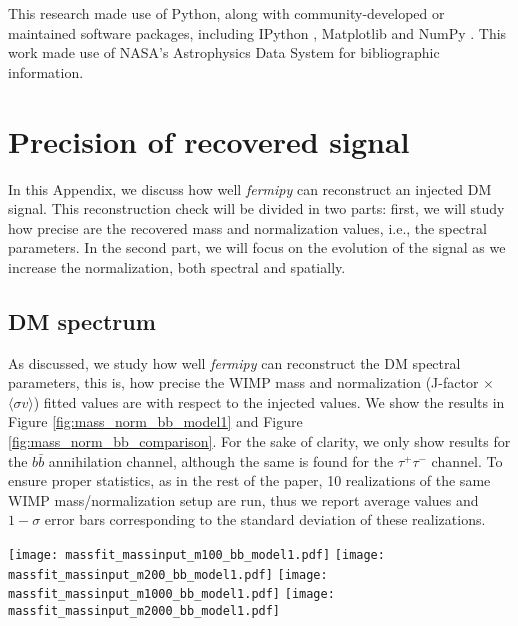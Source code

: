 \documentclass[%
 reprint,
nofootinbib,
 amsmath,amssymb,
 aps,
]{revtex4-2}
\begin{document}
This research made use of Python, along with community-developed or maintained software packages, including IPython \cite{Perez2007}, Matplotlib \cite{Hunter2007} and NumPy \cite{Walt2011}. This work made use of NASA’s Astrophysics Data System for bibliographic information.

\appendix

\section{Precision of recovered signal}
In this Appendix, we discuss how well \textit{fermipy} can reconstruct an injected DM signal. This reconstruction check will be divided in two parts: first, we will study how precise are the recovered mass and normalization values, i.e., the spectral parameters. In the second part, we will focus on the evolution of the signal as we increase the normalization, both spectral and spatially. %

\subsection{DM spectrum}
\label{app:precision_dm_spectrum}
As discussed, we study how well \textit{fermipy} can reconstruct the DM spectral parameters, this is, how precise the WIMP mass and normalization (J-factor $\times$ $\langle\sigma v\rangle$) fitted values are with respect to the injected values. We show the results in Figure \ref{fig:mass_norm_bb_model1} and Figure \ref{fig:mass_norm_bb_comparison}. For the sake of clarity, we only show results for the $b\bar{b}$ annihilation channel, although the same is found for the $\tau^+\tau^-$ channel. To ensure proper statistics, as in the rest of the paper, 10 realizations of the same WIMP mass/normalization setup are run, thus we report average values and $1-\sigma$ error bars corresponding to the standard deviation of these realizations.

\begin{figure*}[!ht]
\centering
\texttt{[image: massfit\_massinput\_m100\_bb\_model1.pdf]}
\texttt{[image: massfit\_massinput\_m200\_bb\_model1.pdf]}
\texttt{[image: massfit\_massinput\_m1000\_bb\_model1.pdf]}
\texttt{[image: massfit\_massinput\_m2000\_bb\_model1.pdf]}
\caption{Comparison between the injected DM signal and the recovered one, in terms of recovered WIMP mass and normalization (J-factor $\times$ $\langle\sigma v\rangle$, with units $\mathrm{GeV^2\cdot cm^{-2}\cdot s^{-1}}$), for the $b\bar{b}$ annihilation channel and the $10^4~\mathrm{M_\odot}$ subhalo model. Note that, as the input mass is increased, less points are present, as the lowest normalization values do not provide detection, indeed only the largest normalizations allowing for a proper characterization of the DM spectrum. Values and error bars refer to average and standard deviation as obtained from 10 realizations. Black, dashed line marks the true values of WIMP mass and normalization (unity ratios).}
\label{fig:mass_norm_bb_model1}
\end{figure*}
\end{document}
